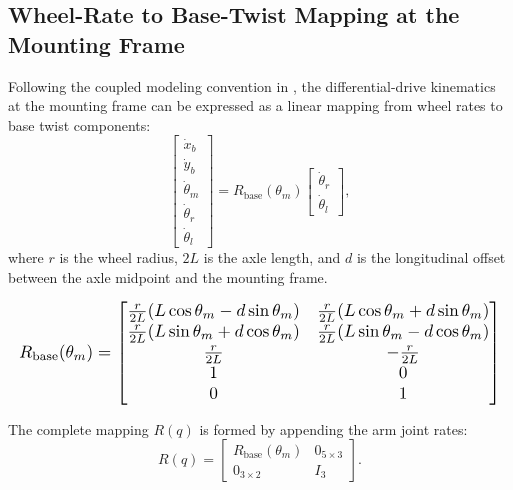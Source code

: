 \documentclass[conference]{IEEEtran}
\begin{document}
\subsection{Wheel-Rate to Base-Twist Mapping at the Mounting Frame}
\label{subsec:Rbase}

Following the coupled modeling convention in \cite{prada-jimenezCoupledDynamicModel2019a}, the differential-drive kinematics at the mounting frame can be expressed as a linear mapping from wheel rates to base twist components:
\begin{equation}
\begin{bmatrix}
\dot{x}_b\\
\dot{y}_b\\
\dot{\theta}_m\\
\dot{\theta}_r\\
\dot{\theta}_l
\end{bmatrix}
=
R_{\mathrm{base}}(\theta_m)
\begin{bmatrix}
\dot{\theta}_r\\
\dot{\theta}_l
\end{bmatrix},
\label{eq:base_map}
\end{equation}
where $r$ is the wheel radius, $2L$ is the axle length, and $d$ is the longitudinal offset between the axle midpoint and the mounting frame.

\begin{equation}
\resizebox{\columnwidth}{!}{$
R_{\mathrm{base}}(\theta_m)=
\begin{bmatrix}
\frac{r}{2L}(L\cos\theta_m-d\sin\theta_m) &
\frac{r}{2L}(L\cos\theta_m+d\sin\theta_m)\\
\frac{r}{2L}(L\sin\theta_m+d\cos\theta_m) &
\frac{r}{2L}(L\sin\theta_m-d\cos\theta_m)\\
\frac{r}{2L} & -\frac{r}{2L}\\
1 & 0\\
0 & 1
\end{bmatrix}
$}
\label{eq:Rbase}
\end{equation}

The complete mapping $R(q)$ is formed by appending the arm joint rates:
\begin{equation}
R(q)=
\begin{bmatrix}
R_{\mathrm{base}}(\theta_m) & 0_{5\times 3}\\
0_{3\times 2} & I_3
\end{bmatrix}.
\label{eq:R_full}
\end{equation}
\end{document}
